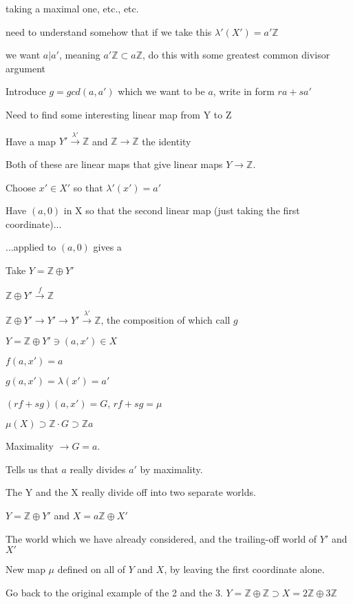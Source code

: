 \documentclass[12pt]{article}
\begin{document}
taking a maximal one, etc., etc.

need to understand somehow that if we take this $\lambda'(X') = a'\mathds{Z}$

we want $a | a'$, meaning $a'\mathds{Z} \subset a\mathds{Z}$, do this with some greatest common divisor argument

\noindent
Introduce $g = gcd(a, a')$ which we want to be $a$, write in form $ra + sa'$

Need to find some interesting linear map from Y to Z

Have a map $Y' \xrightarrow{\lambda'} \mathds{Z}$ and $\mathds{Z} \to \mathds{Z}$ the identity

Both of these are linear maps that give linear maps $Y \to \mathds{Z}$.

Choose $x' \in X'$ so that $\lambda'(x') = a'$

Have $(a, 0)$ in X so that the second linear map (just taking the first coordinate)...

...applied to $(a, 0)$ gives a

\noindent
Take $Y = \mathds{Z} \oplus Y'$

$\mathds{Z} \oplus Y' \xrightarrow{f} \mathds{Z}$

$\mathds{Z} \oplus Y' \to Y' \to Y' \xrightarrow{\lambda'} \mathds{Z}$, the composition of which call $g$

$Y = \mathds{Z} \oplus Y' \ni (a, x') \in X$

$f(a, x') = a$

$g(a, x') = \lambda(x') = a'$

$(rf + sg)(a, x') = G$, $rf + sg = \mu$

\noindent
$\mu(X) \supset \mathds{Z} \cdot G \supset \mathds{Z}a$

Maximality $\to G = a$.

Tells us that $a$ really divides $a'$ by maximality.

\noindent
The Y and the X really divide off into two separate worlds.

$Y = \mathds{Z} \oplus Y'$ and $X = a\mathds{Z} \oplus X'$

The world which we have already considered, and the trailing-off world of $Y'$ and $X'$

New map $\mu$ defined on all of $Y$ and $X$, by leaving the first coordinate alone.

\noindent
Go back to the original example of the 2 and the 3.  $Y = \mathds{Z} \oplus \mathds{Z} \supset X = 2\mathds{Z} \oplus 3\mathds{Z}$
\end{document}
